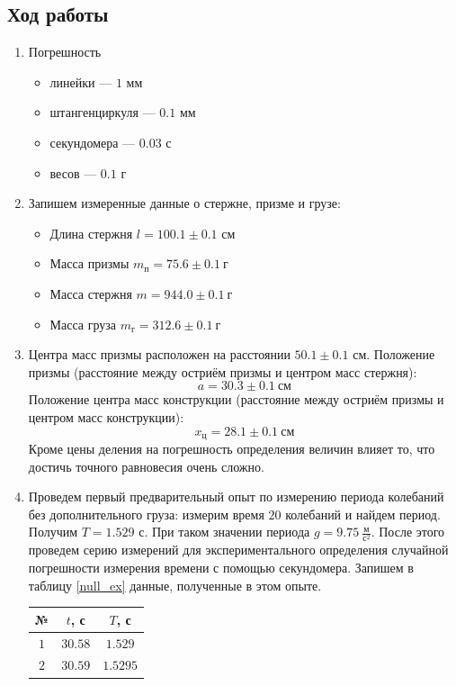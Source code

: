 \documentclass[12pt]{article}
\begin{document}
	\subsection*{Ход работы}
	\begin{enumerate}[label={\textbf{\arabic*.}}]
		\item Погрешность
		\begin{itemize}
			\item линейки --- $1$ мм
			\item штангенциркуля --- $0.1$ мм
			\item секундомера --- $0.03$ с
			\item весов --- $0.1$ г
		\end{itemize}
		\item Запишем измеренные данные о стержне, призме и грузе:
		\begin{itemize}
			\item Длина стержня $l = 100.1\pm0.1$ см
			\item Масса призмы $m_{\text{п}} = 75.6\pm0.1~\text{г}$
			\item Масса стержня $m = 944.0\pm0.1~\text{г}$
			\item Масса груза $m_{\text{г}} = 312.6\pm0.1~\text{г}$
		\end{itemize}
		\item Центра масс призмы расположен на расстоянии $50.1\pm0.1$ см. Положение призмы (расстояние между остриём призмы и центром масс стержня): 
		$$
		a = 30.3\pm0.1~\text{см}
		$$
		Положение центра масс конструкции (расстояние между остриём призмы и центром масс конструкции): $$
		x_\text{ц} = 28.1\pm0.1~\text{см}
		$$
		Кроме цены деления на погрешность определения величин влияет то, что достичь точного равновесия очень сложно.
		\item Проведем первый предварительный опыт по измерению периода колебаний без дополнительного груза: измерим время $20$ колебаний и найдем период. Получим $T = 1.529$ с. При таком значении периода $g = 9.75~\frac{\text{м}}{\text{с}^2}$.
		После этого проведем серию измерений для экспериментального определения случайной погрешности измерения времени с помощью секундомера. Запишем в таблицу \ref{null_ex} данные, полученные в этом опыте.
		\begin{table}[h]
			\centering
			\begin{tabular}{|c|c|c|}\hline
				№   & $t$, с  & $T$, с \\ \hline
				$1$ & $30.58$ &	$1.529$ \\
				$2$	& $30.59$ &	$1.5295$ \\

\end{tabular}
\end{table}
\end{enumerate}
\end{document}
